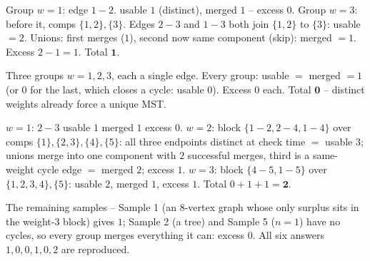 \begin{tracebox}
Group \(w{=}1\): edge \(1\!-\!2\).  usable \(1\) (distinct), merged \(1\) -- excess
\(0\).  Group \(w{=}3\): before it, comps \(\{1,2\},\{3\}\).  Edges \(2\!-\!3\) and
\(1\!-\!3\) both join \(\{1,2\}\) to \(\{3\}\): usable \(=2\).  Unions: first merges
(\(1\)), second now same component (skip): merged \(=1\).  Excess \(2-1=1\).  Total
\(\mathbf{1}\).
\end{tracebox}
\begin{tracebox}
Three groups \(w{=}1,2,3\), each a single edge.  Every group: usable \(=\) merged
\(=1\) (or \(0\) for the last, which closes a cycle: usable \(0\)).  Excess \(0\)
each.  Total \(\mathbf{0}\) -- distinct weights already force a unique MST.
\end{tracebox}
\begin{tracebox}[Sample 6: \, \(n=5\): \(1\!-\!2{:}2,2\!-\!3{:}1,4\!-\!5{:}3,2\!-\!4{:}2,1\!-\!4{:}2,1\!-\!5{:}3\) \(\to 2\)]
\(w{=}1\): \(2\!-\!3\) usable \(1\) merged \(1\) excess \(0\).  \(w{=}2\): block
\(\{1\!-\!2,2\!-\!4,1\!-\!4\}\) over comps \(\{1\},\{2,3\},\{4\},\{5\}\): all three
endpoints distinct at check time \(=\) usable \(3\); unions merge into one
component with \(2\) successful merges, third is a same-weight cycle edge \(=\)
merged \(2\); excess \(1\).  \(w{=}3\): block \(\{4\!-\!5,1\!-\!5\}\) over
\(\{1,2,3,4\},\{5\}\): usable \(2\), merged \(1\), excess \(1\).  Total
\(0+1+1=\mathbf{2}\).
\end{tracebox}
The remaining samples -- Sample 1 (an \(8\)-vertex graph whose only surplus sits in
the weight-\(3\) block) gives \(1\); Sample 2 (a tree) and Sample 5 (\(n=1\)) have
no cycles, so every group merges everything it can: excess \(0\).  All six
answers \(1,0,0,1,0,2\) are reproduced.

